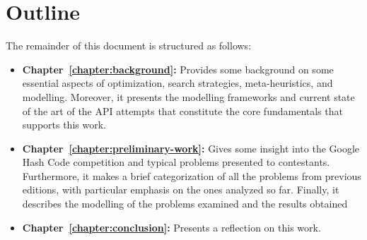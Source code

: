 \section{Outline}
\label{section:outline}

The remainder of this document is structured as follows:

\begin{itemize}
  \item \textbf{Chapter~\ref{chapter:background}:} Provides some background
        on some essential aspects of optimization, search strategies,
        meta-heuristics, and modelling. Moreover, it presents the modelling
        frameworks and current state of the art of the API attempts that
        constitute the core fundamentals that~\cite{outeiro2021application}
        supports this work.

  \item \textbf{Chapter~\ref{chapter:preliminary-work}:}
        Gives some insight into the Google Hash Code competition and typical
        problems presented to contestants. Furthermore, it makes a brief
        categorization of all the problems from previous editions, with particular
        emphasis on the ones analyzed so far. Finally, it describes the modelling
        of the problems examined and the results obtained


  \item \textbf{Chapter~\ref{chapter:conclusion}:} Presents a reflection on this work.
\end{itemize}
